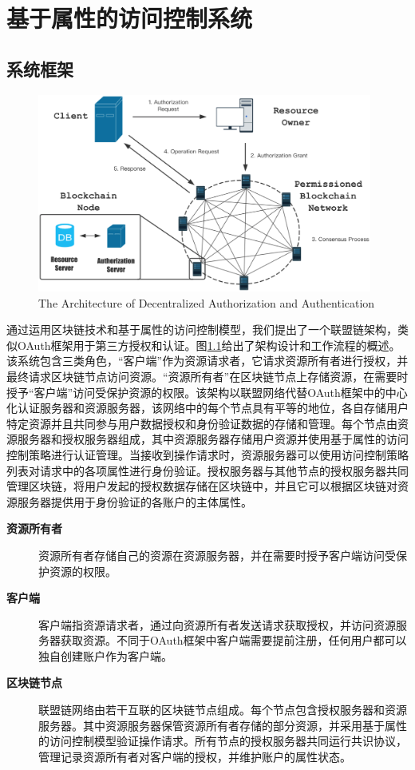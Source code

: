 
\chapter{基于属性的访问控制系统}

\section{系统框架}

\begin{figure}
\centering
\includegraphics[width=11cm]{figures/archi.eps}
\caption{The Architecture of Decentralized Authorization and Authentication}
\label{fig:framework}
\end{figure}

通过运用区块链技术和基于属性的访问控制模型，我们提出了一个联盟链架构，类似OAuth框架用于第三方授权和认证。图\ref{fig:framework}给出了架构设计和工作流程的概述。该系统包含三类角色，“客户端”作为资源请求者，它请求资源所有者进行授权，并最终请求区块链节点访问资源。“资源所有者”在区块链节点上存储资源，在需要时授予“客户端”访问受保护资源的权限。该架构以联盟网络代替OAuth框架中的中心化认证服务器和资源服务器，该网络中的每个节点具有平等的地位，各自存储用户特定资源并且共同参与用户数据授权和身份验证数据的存储和管理。每个节点由资源服务器和授权服务器组成，其中资源服务器存储用户资源并使用基于属性的访问控制策略进行认证管理。当接收到操作请求时，资源服务器可以使用访问控制策略列表对请求中的各项属性进行身份验证。授权服务器与其他节点的授权服务器共同管理区块链，将用户发起的授权数据存储在区块链中，并且它可以根据区块链对资源服务器提供用于身份验证的各账户的主体属性。

\begin{description}
  \item[\textbf{资源所有者}] 资源所有者存储自己的资源在资源服务器，并在需要时授予客户端访问受保护资源的权限。
  \item[\textbf{客户端}] 客户端指资源请求者，通过向资源所有者发送请求获取授权，并访问资源服务器获取资源。不同于OAuth框架中客户端需要提前注册，任何用户都可以独自创建账户作为客户端。
  \item[\textbf{区块链节点}] 联盟链网络由若干互联的区块链节点组成。每个节点包含授权服务器和资源服务器。其中资源服务器保管资源所有者存储的部分资源，并采用基于属性的访问控制模型验证操作请求。所有节点的授权服务器共同运行共识协议，管理记录资源所有者对客户端的授权，并维护账户的属性状态。
\end{description}

